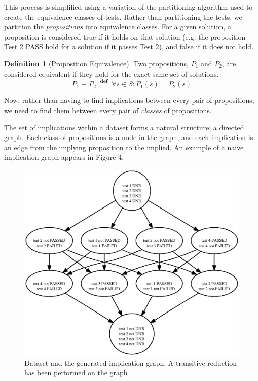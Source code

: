 \documentclass[11pt,twoside]{article}
\newcommand\defined{\mathrel{\;\stackrel{\scriptscriptstyle\mathbf{def}}{=}\;}}
\theoremstyle{definition}
\newtheorem{defn}{Definition}
\begin{document}
This process is simplified using a variation of the partitioning algorithm used to create the equivalence classes of tests. Rather than partitioning the tests, we partition the \emph{propositions} into equivalence classes. For a given solution, a proposition is considered true if it holds on that solution (e.g. the proposition Test 2 PASS hold for a solution if it passes Test 2), and false if it does not hold. 
\begin{defn}[Proposition Equivalence]
Two propositions, $P_1$ and $P_2$, are considered equivalent if they hold for the exact same set of solutions.
$$P_1 \equiv P_2 \defined \forall s \in S : P_1(s) = P_2(s)$$
\end{defn}
Now, rather than having to find implications between every pair of propositions, we need to find them between every pair of \emph{classes} of propositions.

The set of implications within a dataset forms a natural structure: a directed graph. Each class of propositions is a node in the graph, and each implication is an edge from the implying proposition to the implied. An example of a naive implication graph appears in Figure 4.

\begin{figure}

\includegraphics[width=\textwidth]{toyimpl.ps}
\caption{Dataset and the generated implication graph. A transitive reduction has been performed on the graph}
\end{figure}
\end{document}
